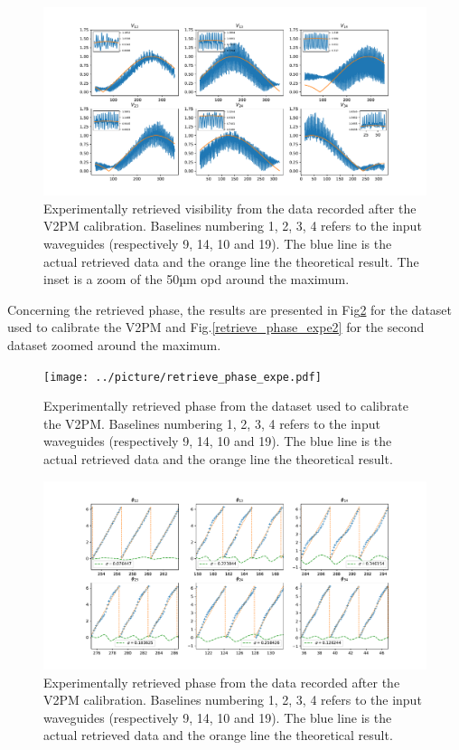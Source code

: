 \begin{figure}[htbp!]
 \centering
 \includegraphics[scale=.45]{../picture/retrieve_visi_expe2.pdf}
 \caption{Experimentally retrieved visibility from the data recorded after the V2PM calibration. Baselines numbering 1, 2, 3, 4 refers to the input waveguides (respectively  9, 14, 10 and 19). The blue line is the actual retrieved data and the orange line the theoretical result. The inset is a zoom of the 50µm opd around the maximum. }
 \label{fig:retrieved_visi_expe2}
\end{figure}

Concerning the retrieved phase, the results are presented in Fig\ref{fig:retrieved_phase_expe} for the dataset used to calibrate the V2PM and Fig.\ref{retrieve_phase_expe2} for the second dataset zoomed around the maximum.

\begin{figure}[htbp!]
 \centering
 \texttt{[image: ../picture/retrieve\_phase\_expe.pdf]}
 \caption{Experimentally retrieved phase from the dataset used to calibrate the V2PM. Baselines numbering 1, 2, 3, 4 refers to the input waveguides (respectively  9, 14, 10 and 19). The blue line is the actual retrieved data and the orange line the theoretical result. }
 \label{fig:retrieved_phase_expe}
\end{figure}

\begin{figure}[htbp!]
 \centering
 \includegraphics[scale=.45]{../picture/retrieve_phase_expe2.pdf}
 \caption{Experimentally retrieved phase from the data recorded after the V2PM calibration. Baselines numbering 1, 2, 3, 4 refers to the input waveguides (respectively  9, 14, 10 and 19). The blue line is the actual retrieved data and the orange line the theoretical result. }
 \label{fig:retrieved_phase_expe2}
\end{figure}
